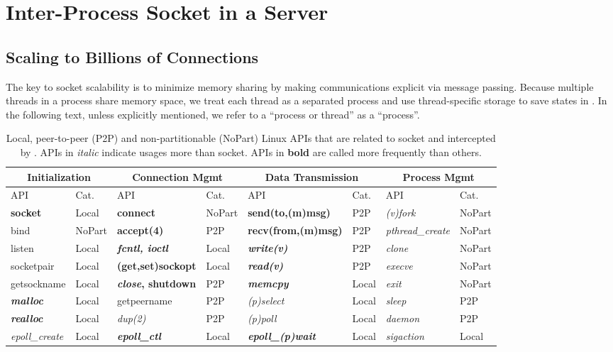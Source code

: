 \section{Inter-Process Socket in a Server}
\label{sec:intra-server}

\subsection{Scaling to Billions of Connections}
\label{subsec:socket-api}

The key to socket scalability is to minimize memory sharing by making communications explicit via message passing. Because multiple threads in a process share memory space, we treat each thread as a separated process and use thread-specific storage to save states in \libipc. In the following text, unless explicitly mentioned, we refer to a ``process or thread'' as a ``process''.

\begin{table}[t]
\centering
\begin{tabular}{ll|ll|ll|ll}
	\hline
	\multicolumn{2}{c|}{Initialization} &
	\multicolumn{2}{c|}{Connection Mgmt} &
	\multicolumn{2}{c|}{Data Transmission} &
	\multicolumn{2}{c}{Process Mgmt} \\
	\hline
	API & Cat. &
	API & Cat. &
	API & Cat. &
	API & Cat. \\
	\hline
	\hline
	\textbf{socket} & Local &
	\textbf{connect} & NoPart &
	\textbf{send(to,(m)msg)} & P2P &
	\textit{(v)fork} & NoPart \\
	\hline
	bind & NoPart &
	\textbf{accept(4)} & P2P &
	\textbf{recv(from,(m)msg)} & P2P &
	\textit{pthread\_create} & NoPart \\
	\hline
    listen & Local &
    \textbf{\textit{fcntl, ioctl}} & Local &
	\textbf{\textit{write(v)}} & P2P &
 	\textit{clone} & NoPart \\
	\hline
	socketpair & Local &
	\textbf{(get,set)sockopt} & Local &
	\textbf{\textit{read(v)}} & P2P &
 	\textit{execve} & NoPart \\
	\hline
	getsockname  & Local &
	\textbf{\textit{close}, shutdown} & P2P &
	\textbf{\textit{memcpy}} & Local &
	\textit{exit} & NoPart \\
	\hline
	\textbf{\textit{malloc}} & Local &
	getpeername & P2P &
	\textit{(p)select} & Local &
	\textit{sleep} & P2P \\
	\hline
	\textbf{\textit{realloc}} & Local &
	\textit{dup(2)} & P2P &
	\textit{(p)poll} & Local &
	\textit{daemon} & P2P \\
	\hline
	\textit{epoll\_create} & Local &
	\textbf{\textit{epoll\_ctl}} & Local &
	\textbf{\textit{epoll\_(p)wait}} & Local &
	\textit{sigaction} & Local \\
	\hline
\end{tabular}
\caption{Local, peer-to-peer (P2P) and non-partitionable (NoPart) Linux APIs that are related to socket and intercepted by \libipc{}. APIs in \textit{italic} indicate usages more than socket. APIs in \textbf{bold} are called more frequently than others.}
\label{tab:socket-api}
\end{table}

